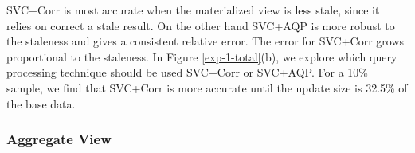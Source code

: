 SVC+Corr is most accurate when the materialized view is less stale, since it relies on correct a stale result.
On the other hand SVC+AQP is more robust to the staleness and gives a consistent relative error.
The error for SVC+Corr grows proportional to the staleness.
In Figure \ref{exp-1-total}(b), we explore which query processing technique should be used SVC+Corr or SVC+AQP.
For a 10\% sample, we find that SVC+Corr is more accurate until the update size is 32.5\% of the base data.




\subsubsection{Aggregate View}
\label{exp-datacube}

